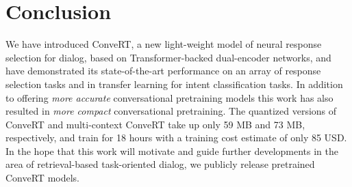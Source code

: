 \documentclass[11pt,a4paper]{article}
\begin{document}
\section{Conclusion}
\label{s:conclusion}
We have introduced ConveRT, a new light-weight model of neural response selection for dialog, based on Transformer-backed dual-encoder networks, and have demonstrated its state-of-the-art performance on an array of response selection tasks and in transfer learning for intent classification tasks. In addition to offering \textit{more accurate} conversational pretraining models this work has also resulted in \textit{more compact} conversational pretraining. The quantized versions of ConveRT and multi-context ConveRT take up only 59 MB and 73 MB, respectively, and train for 18 hours with a training cost estimate of only 85 USD. In the hope that this work will motivate and guide further developments in the area of retrieval-based task-oriented dialog, we publicly release pretrained ConveRT models.



%
 

\clearpage


\end{document}
